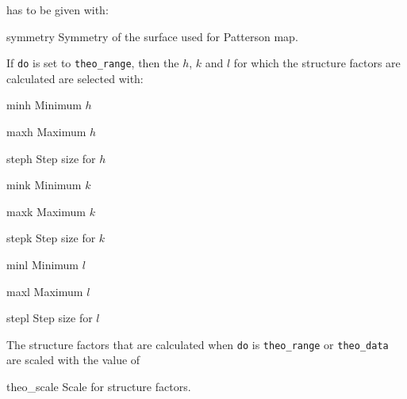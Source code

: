 \documentclass[a4paper]{article}
\begin{document}
has to be given with:
\begin{vardef}
\item[symmetry] Symmetry of the surface used for Patterson map.
\end{vardef}
If \texttt{do} is set to \texttt{theo\_range}, then the $h$, $k$ and
$l$ for which the structure factors are calculated are selected
with:
\begin{vardef}
\item[minh] Minimum $h$
\item[maxh] Maximum $h$
\item[steph] Step size for $h$
\item[mink] Minimum $k$
\item[maxk] Maximum $k$
\item[stepk] Step size for $k$
\item[minl] Minimum $l$
\item[maxl] Maximum $l$
\item[stepl] Step size for $l$
\end{vardef}
The structure factors that are calculated when \texttt{do} is
\texttt{theo\_range} or \texttt{theo\_data} are scaled with the value
of 
\begin{vardef}
\item[theo\_scale] Scale for structure factors.
\end{vardef}
\end{document}
